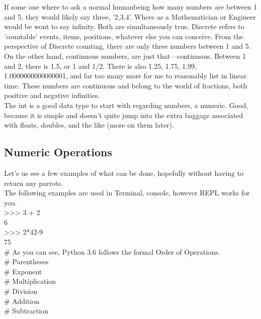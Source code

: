 \documentclass[oneside,12pt]{memoir} %
\begin{document}
If some one where to ask a normal humanbeing how many numbers are between 1 and 5, they would likely say three, '2,3,4'. Where as a Mathematician or Engineer would be wont to say infinity. Both are simultaneously true. Discrete refers to 'countable' events, items, positions, whatever else you can conceive. From the perspective of Discrete counting, there are only three numbers between 1 and 5. \\
On the other hand, continuous numbers, are just that––continuous. Between 1 and 2, there is 1.5, or 1 and 1/2. There is also 1.25, 1.75, 1.99, 1.0000000000000001, and far too many more for me to reasonably list in linear time. These numbers are continuous and belong to the world of fractions, both positive and negative infinities. \\

The int is a good data type to start with regarding numbers, a numeric. Good, because it is simple and doesn't quite jump into the extra baggage associated with floats, doubles, and the like (more on them later).\\

\subsection{Numeric Operations} %
\label{sub:numeric_operations}


Let's us see a few examples of what can be done, hopefully without having to return any parrots. \\
The following examples are used in Terminal, console, however REPL works for you. \\

{>}{>}{>} 3 + 2\\
6\\
{>}{>}{>} 2*42-9\\
75\\
\# As you can see, Python 3.6 follows the formal Order of Operations.\\
\# Parentheses\\
\# Exponent\\
\# Multiplication\\
\# Division\\
\# Addition\\
\# Subtraction\\
\end{document}
